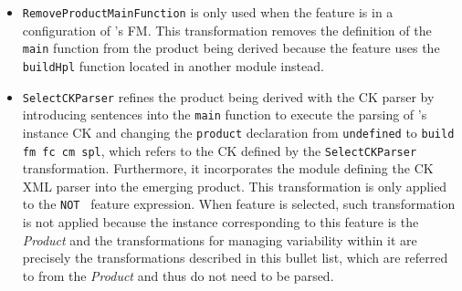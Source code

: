 \begin{itemize}
\item \texttt{RemoveProductMainFunction} is only used when the \hp{} feature is in a configuration of \hpl's FM. This transformation removes the definition of the \texttt{main} function from the product being derived because the \hp{} feature uses the \texttt{buildHpl} function located in another module instead.

\item \texttt{SelectCKParser} refines the product being derived with the CK parser by introducing sentences into the \texttt{main} function to execute the parsing of \hpl's instance CK and changing the \texttt{product} declaration from \texttt{undefined} to \texttt{build fm fc cm spl}, which refers to the CK defined by the \texttt{SelectCKParser} transformation. Furthermore, it incorporates the module defining the CK XML parser into the emerging product. This transformation is only applied to the \texttt{NOT \hp{}} feature expression. When \texttt{\hp{}} feature is selected, such transformation is not applied because the instance corresponding to this feature is the \hp{} \emph{Product} and the transformations for managing variability within it are precisely the transformations described in this bullet list, which are referred to from the \hp{} \emph{Product} and thus do not need to be parsed.

\end{itemize}


